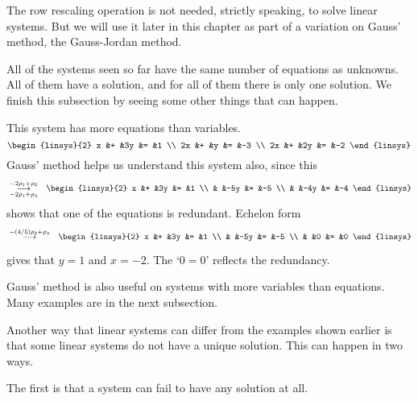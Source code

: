The row rescaling operation is 
not needed, strictly speaking, to solve linear systems.  
But we will use it 
later in this chapter as part of a variation on Gauss' method, 
the Gauss-Jordan method.

All of the systems seen so far have the same number of equations as unknowns.
All of them have a solution, and for all of them there is only one solution.
We finish this subsection by seeing
some other things that can happen.

\begin{example} \label{ex:MoreEqsThanUnks}
This system 
has more equations than variables.
\begin{equation*}
    \begin{linsys}{2}
      x  &+  &3y  &=  &1  \\
     2x  &+  &y   &=  &-3 \\
     2x  &+  &2y  &=  &-2 
    \end{linsys}  
\end{equation*}
Gauss' method helps us understand this system also, since this
  \begin{eqnarray*}
    &\grstep[-2\rho_1 +\rho_3]{-2\rho_1 +\rho_2}
    &\begin{linsys}{2}
       x  &+  &3y  &=  &1  \\
          &   &-5y &=  &-5 \\
          &   &-4y &=  &-4 
     \end{linsys}
   \end{eqnarray*}
shows that one of the equations is redundant.
Echelon form
\begin{eqnarray*}
    &\grstep{-(4/5)\rho_2 +\rho_3}
    &\begin{linsys}{2}
       x  &+  &3y  &=  &1  \\
          &   &-5y &=  &-5 \\
          &   &0   &=  &0  
     \end{linsys}
   \end{eqnarray*}
gives that \( y=1 \) and \( x=-2 \).
The `\( 0=0 \)' reflects the redundancy.
\end{example}

Gauss' method is also useful on systems with more variables than equations.
Many examples are in the next subsection.

Another way that linear systems can differ from the examples shown earlier 
is that some linear systems do not have a unique solution.
This can happen in two ways.

The first is that a system can fail to have any solution at all.


